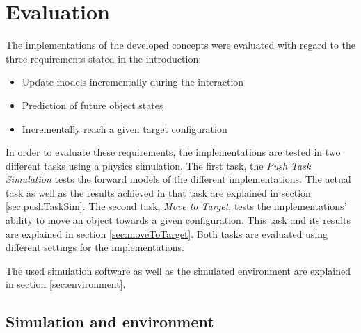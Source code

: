 \chapter{Evaluation\label{chap:evaluation}}



The implementations of the developed concepts were evaluated with regard to the three requirements stated in the introduction: 
\begin{itemize}
\item Update models incrementally during the interaction
\item Prediction of future object states
\item Incrementally reach a given target configuration
\end{itemize}

In order to evaluate these requirements, the implementations are tested in two different tasks using a physics simulation. The first task, the \textit{Push Task Simulation} tests the forward models of the different implementations. The actual task as well as the results achieved in that task are explained in section \ref{sec:pushTaskSim}.
The second task, \textit{Move to Target}, tests the implementations' ability to move an object towards a given configuration. This task and its results are explained in section \ref{sec:moveToTarget}.
Both tasks are evaluated using different settings for the implementations.

The used simulation software as well as the simulated environment are explained in section \ref{sec:environment}.


\section{Simulation and environment \label{sec:environment}} 

